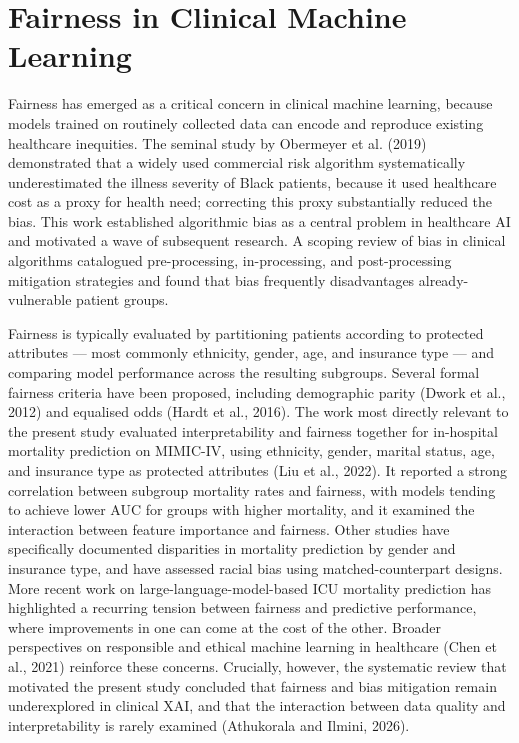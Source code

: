\documentclass[12pt,a4paper]{report}
\begin{document}
\section{Fairness in Clinical Machine Learning}
Fairness has emerged as a critical concern in clinical machine learning, because models trained on routinely collected data can encode and reproduce existing healthcare inequities. The seminal study by Obermeyer et al. (2019) demonstrated that a widely used commercial risk algorithm systematically underestimated the illness severity of Black patients, because it used healthcare cost as a proxy for health need; correcting this proxy substantially reduced the bias. This work established algorithmic bias as a central problem in healthcare AI and motivated a wave of subsequent research. A scoping review of bias in clinical algorithms catalogued pre-processing, in-processing, and post-processing mitigation strategies and found that bias frequently disadvantages already-vulnerable patient groups.

Fairness is typically evaluated by partitioning patients according to protected attributes --- most commonly ethnicity, gender, age, and insurance type --- and comparing model performance across the resulting subgroups. Several formal fairness criteria have been proposed, including demographic parity (Dwork et al., 2012) and equalised odds (Hardt et al., 2016). The work most directly relevant to the present study evaluated interpretability and fairness together for in-hospital mortality prediction on MIMIC-IV, using ethnicity, gender, marital status, age, and insurance type as protected attributes (Liu et al., 2022). It reported a strong correlation between subgroup mortality rates and fairness, with models tending to achieve lower AUC for groups with higher mortality, and it examined the interaction between feature importance and fairness. Other studies have specifically documented disparities in mortality prediction by gender and insurance type, and have assessed racial bias using matched-counterpart designs. More recent work on large-language-model-based ICU mortality prediction has highlighted a recurring tension between fairness and predictive performance, where improvements in one can come at the cost of the other. Broader perspectives on responsible and ethical machine learning in healthcare (Chen et al., 2021) reinforce these concerns. Crucially, however, the systematic review that motivated the present study concluded that fairness and bias mitigation remain underexplored in clinical XAI, and that the interaction between data quality and interpretability is rarely examined (Athukorala and Ilmini, 2026).
\end{document}
